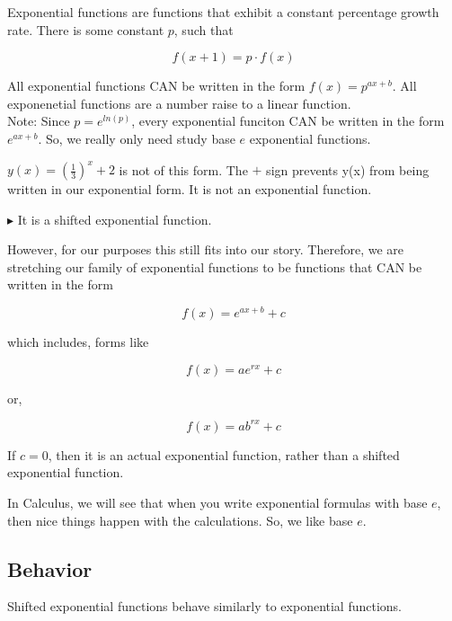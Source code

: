 \documentclass{ximera}
\begin{document}
\begin{warning}

Exponential functions are functions that exhibit a constant percentage growth rate.  There is some constant $p$, such that

\[
f(x+1) = p \cdot f(x)
\]


All exponential functions CAN be written in the form $f(x) = p^{a x + b}$.  All exponenetial functions are a number raise to a linear function.  \\


Note: Since $p = e^{ln(p)}$, every exponential funciton CAN be written in the form $e^{a x + b}$.  So, we really only need study base $e$ exponential functions.



$y(x) = \left(\frac{1}{3}\right)^x + 2$ is not of this form.  The $+$ sign prevents y(x) from being written in our exponential form.  It is not an exponential function.

$\blacktriangleright$ It is a shifted exponential function.


However, for our purposes this still fits into our story.  Therefore, we are stretching our family of exponential functions to be functions that CAN be written in the form

\[
f(x) = e^{a x + b} + c
\]

which includes, forms like



\[
f(x) = a e^{r x} + c
\]

or,

\[
f(x) = a b^{r x} + c
\]



If $c = 0$, then it is an actual exponential function, rather than a shifted exponential function.


\end{warning}



In Calculus, we will see that when you write exponential formulas with base $e$, then nice things happen with the calculations.  So, we like base $e$. \\




\subsection*{Behavior}


Shifted exponential functions behave similarly to exponential functions. \\
\end{document}

